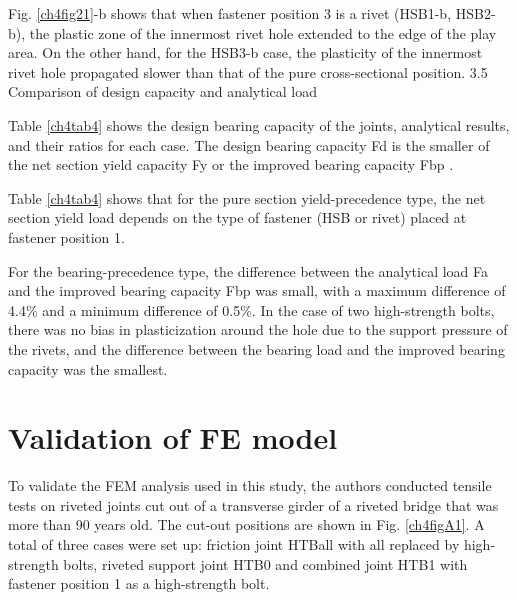 Fig. \ref{ch4fig21}-b shows that when fastener position 3 is a rivet (HSB1-b, HSB2-b), the plastic zone of the innermost rivet hole extended to the edge of the play area. On the other hand, for the HSB3-b case, the plasticity of the innermost rivet hole propagated slower than that of the pure cross-sectional position.
 3.5 Comparison of design capacity and analytical load

Table \ref{ch4tab4} shows the design bearing capacity of the joints, analytical results, and their ratios for each case. The design bearing capacity Fd is the smaller of the net section yield capacity Fy or the improved bearing capacity Fbp .

Table \ref{ch4tab4} shows that for the pure section yield-precedence type, the net section yield load depends on the type of fastener (HSB or rivet) placed at fastener position 1.

For the bearing-precedence type, the difference between the analytical load Fa and the improved bearing capacity Fbp was small, with a maximum difference of 4.4\% and a minimum difference of 0.5\%. In the case of two high-strength bolts, there was no bias in plasticization around the hole due to the support pressure of the rivets, and the difference between the bearing load and the improved bearing capacity was the smallest.


\section{Validation of FE model}

To validate the FEM analysis used in this study, the authors conducted tensile tests on riveted joints cut out of a transverse girder of a riveted bridge that was more than 90 years old. The cut-out positions are shown in Fig. \ref{ch4figA1}.
A total of three cases were set up: friction joint HTBall with all replaced by high-strength bolts, riveted support joint HTB0 and combined joint HTB1 with fastener position 1 as a high-strength bolt.


